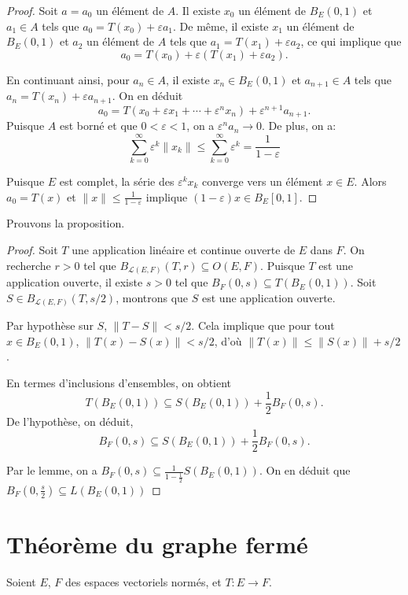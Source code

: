 \begin{proof}
  Soit $a = a_0$ un élément de $A$. Il existe $x_0$ un élément
  de $B_E(0, 1)$ et $a_1\in A$ tels que $a_0 = T(x_0) + \varepsilon a_1$.
  De même, il existe $x_1$ un élément de $B_E(0, 1)$ et $a_2$ un élément
  de $A$ tels que $a_1 = T(x_1) + \varepsilon a_2$, ce qui implique
  que
  $$a_0 = T(x_0) + \varepsilon (T(x_1) +\varepsilon a_2).$$

  En continuant ainsi, pour $a_n\in A$, il existe $x_n\in B_E(0, 1)$
  et $a_{n+1}\in A$ tels que $a_n = T(x_n) + \varepsilon a_{n+1}$. On en déduit
  $$a_0 = T(x_0 + \varepsilon x_1 + \cdots + \varepsilon^nx_n)+%
  \varepsilon^{n+1}a_{n+1}.$$
  Puisque $A$ est borné et que $0 < \varepsilon < 1$, on a
  $\varepsilon^na_n \to 0$. De plus, on a:
  $$\sum_{k=0}^{\infty}\varepsilon^k\|x_k\| \leq%
  \sum_{k=0}^{\infty}\varepsilon^k = \frac{1}{1-\varepsilon}$$

  Puisque $E$ est complet, la série des $\varepsilon^kx_k$ converge
  vers un élément $x\in E$. Alors $a_0 = T(x)$ et $\|x\|\leq
  \frac{1}{1-\varepsilon}$ implique $(1-\varepsilon)x \in B_E[0, 1]$.
\end{proof}
Prouvons la proposition.
\begin{proof}
  Soit $T$ une application linéaire et continue ouverte de $E$ dans $F$.
  On recherche $r>0$ tel que $B_{\mathscr L(E, F)}(T, r)\subseteq O(E, F)$.
  Puisque $T$ est une application ouverte, il existe $s>0$ tel que
  $B_F(0, s)\subseteq T(B_E(0, 1))$. Soit $S\in B_{\mathscr L(E, F)}(T, s/2)$,
  montrons que $S$ est une application ouverte.

  Par hypothèse sur $S$, $\|T-S\| < s/2$. Cela implique que pour tout
  $x\in B_E(0, 1)$, $\|T(x) - S(x)\|< s/2$, d'où $\|T(x)\|\leq \| S(x)\| + s/2$.

  En termes d'inclusions d'ensembles, on obtient
  $$T(B_E(0, 1)) \subseteq S(B_E(0, 1))+\frac{1}{2}B_F(0, s).$$
  De l'hypothèse, on déduit,
  $$B_F(0, s) \subseteq S(B_E(0, 1))+\frac{1}{2}B_F(0, s).$$

  Par le lemme, on a $B_F(0, s)\subseteq\frac{1}{1-\frac{1}{2}}S(B_E(0, 1))$.
  On en déduit que $B_F(0, \frac{s}{2})\subseteq L(B_E(0, 1))$
\end{proof}

\section{Théorème du graphe fermé}
Soient $E$, $F$ des espaces vectoriels normés, et $T: E\to F$.

